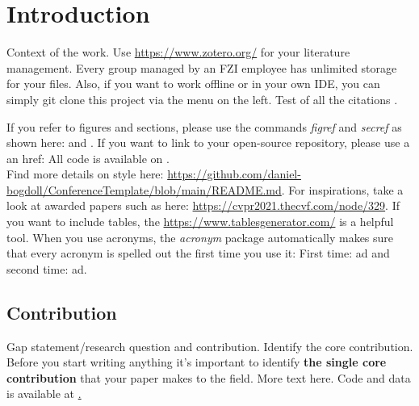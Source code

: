 \section{Introduction}
\label{sec:introduction}

Context of the work. Use \url{https://www.zotero.org/} for your literature management. Every group managed by an FZI employee has unlimited storage for your files. Also, if you want to work offline or in your own IDE, you can simply git clone this project via the menu on the left. Test of all the citations
\cite{Bogdoll_Compressing_2021_NeurIPS}
\cite{Bogdoll_Description_2021_ICCV}
\cite{Bogdoll_KIGLIS_2021_ISC2}
\cite{Bogdoll_Taxonomy_2021_arXiv}
\cite{Toettel_Reliving_2021_arXiv}
\cite{Reichert_Towards_2021_ISC2}
\cite{Koduri_Aureate_2018_WCX, Asam_Openscenario_2020_Web}.

If you refer to figures and sections, please use the commands \textit{figref} and \textit{secref} as shown here:  and . If you want to link to your open-source repository, please use a an href: All code is available on \href{https://github.com/daniel-bogdoll/deep_generative_models}{\color{wong-lightblue}{GitHub}}. \\

Find more details on style here: \url{https://github.com/daniel-bogdoll/ConferenceTemplate/blob/main/README.md}. For inspirations, take a look at awarded papers such as here: \url{https://cvpr2021.thecvf.com/node/329}. If you want to include tables, the \url{https://www.tablesgenerator.com/} is a helpful tool. When you use acronyms, the \textit{acronym} package automatically makes sure that every acronym is spelled out the first time you use it: First time: \ac{ad} and second time: \ac{ad}.

\subsection{Contribution}
Gap statement/research question and contribution. Identify the core contribution. Before you start writing anything it’s important to identify \textbf{the single core contribution} that your paper makes to the field. More text here. Code and data is
available at \href{https://github.com/xxxxx}.

